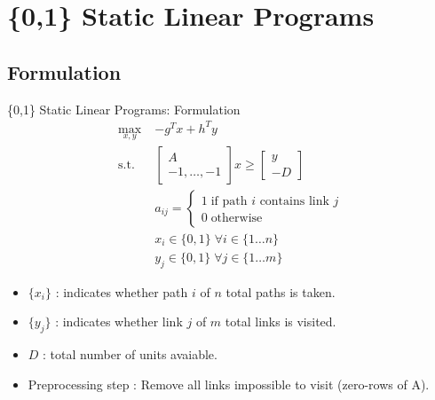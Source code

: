 \documentclass[xcolor=pdflatex,dvipsnames,table]{beamer}
\begin{document}
\section{\{0,1\} Static Linear Programs}
\subsection{Formulation}
\begin{frame}{\{0,1\} Static Linear Programs: Formulation}
\begin{align*}
\max_{x,y}\;& -g^Tx + h^Ty \\
\mbox{s.t.}\;& \left[ \begin{array}{c}
                       A\\
                       -1, \dots, -1
                      \end{array}\right] x \geq \left[ \begin{array}{c} y\\-D \end{array}\right] \\
&a_{ij} = \begin{cases}
           1\;\mbox{if path $i$ contains link $j$}\\
           0\;\mbox{otherwise}
          \end{cases}\\
&x_i \in \{0,1\}\;\forall i\in\{1\dots n\}\\
&y_j \in \{0,1\}\;\forall j\in\{1\dots m\}
\end{align*}

\begin{itemize}
\item $\{x_i\}$ : indicates whether path $i$ of $n$ total paths is taken.
\item $\{y_j\}$ : indicates whether link $j$ of $m$ total links is visited.
\item $D$ : total number of units avaiable.
\item Preprocessing step : Remove all links impossible to visit (zero-rows of A).
\end{itemize}

\end{frame}


\end{document}
